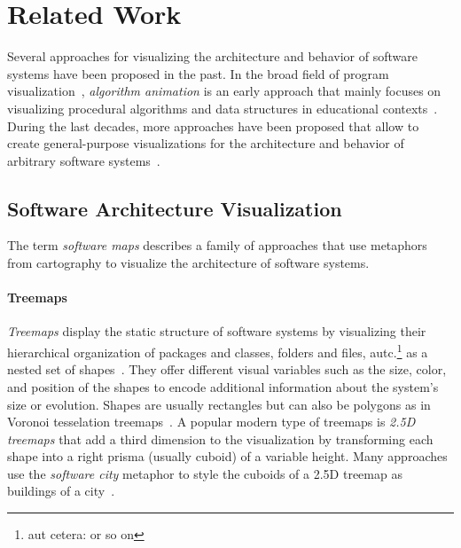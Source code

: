 \section{Related Work}
\label{sec:related_work}

Several approaches for visualizing the architecture and behavior of software systems have been proposed in the past.
In the broad field of program visualization~\cite{myers1986visual,teyseyre2009overview,sorva2013review,merino2018towards}, \emph{algorithm animation} is an early approach that mainly focuses on visualizing procedural algorithms and data structures in educational contexts~\cite{brown1984system}.
During the last decades, more approaches have been proposed that allow to create general-purpose visualizations for the architecture and behavior of arbitrary software systems~\cite{reiss2006visualizing,cheng2008xdiva,chis2014moldable,devkota2022domain}.

\subsection{Software Architecture Visualization}

The term \emph{software maps} describes a family of approaches that use metaphors from cartography to visualize the architecture of software systems.

\paragraph{Treemaps}

\emph{Treemaps} display the static structure of software systems by visualizing their hierarchical organization of packages and classes, folders and files, autc.\footnote{aut cetera: or so on} as a nested set of shapes~\cite{limberger2019advanced,limberger2022visual}.
They offer different visual variables such as the size, color, and position of the shapes to encode additional information about the system's size or evolution.
Shapes are usually rectangles but can also be polygons as in Voronoi tesselation treemaps~\cite{balzer2005voronoi}.
A popular modern type of treemaps is \emph{2.5D treemaps} that add a third dimension to the visualization by transforming each shape into a right prisma (usually cuboid) of a variable height.
Many approaches use the \emph{software city} metaphor to style the cuboids of a 2.5D treemap as buildings of a city~\cite{dugerdil2008execution,wettel2007visualizing,sasso2015blended,ardigo2021visualizing,mortara2021visualization,hoff2022utilizing,limberger2022visual}.

